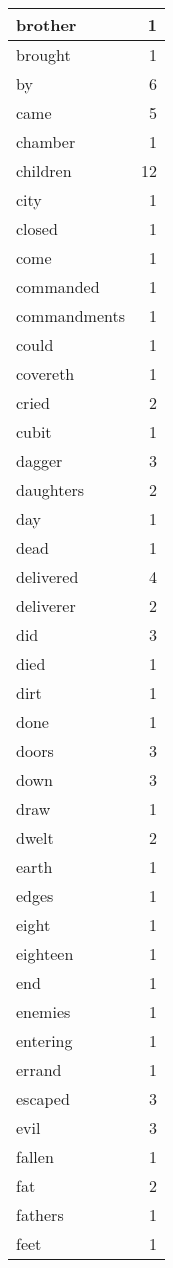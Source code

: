 \begin{center}
\begin{longtable}{l|r}
brother & 1 \\ \hline
brought & 1 \\ \hline
by & 6 \\ \hline
came & 5 \\ \hline
chamber & 1 \\ \hline
children & 12 \\ \hline
city & 1 \\ \hline
closed & 1 \\ \hline
come & 1 \\ \hline
commanded & 1 \\ \hline
commandments & 1 \\ \hline
could & 1 \\ \hline
covereth & 1 \\ \hline
cried & 2 \\ \hline
cubit & 1 \\ \hline
dagger & 3 \\ \hline
daughters & 2 \\ \hline
day & 1 \\ \hline
dead & 1 \\ \hline
delivered & 4 \\ \hline
deliverer & 2 \\ \hline
did & 3 \\ \hline
died & 1 \\ \hline
dirt & 1 \\ \hline
done & 1 \\ \hline
doors & 3 \\ \hline
down & 3 \\ \hline
draw & 1 \\ \hline
dwelt & 2 \\ \hline
earth & 1 \\ \hline
edges & 1 \\ \hline
eight & 1 \\ \hline
eighteen & 1 \\ \hline
end & 1 \\ \hline
enemies & 1 \\ \hline
entering & 1 \\ \hline
errand & 1 \\ \hline
escaped & 3 \\ \hline
evil & 3 \\ \hline
fallen & 1 \\ \hline
fat & 2 \\ \hline
fathers & 1 \\ \hline
feet & 1 \\ \hline

\end{longtable}
\end{center}
